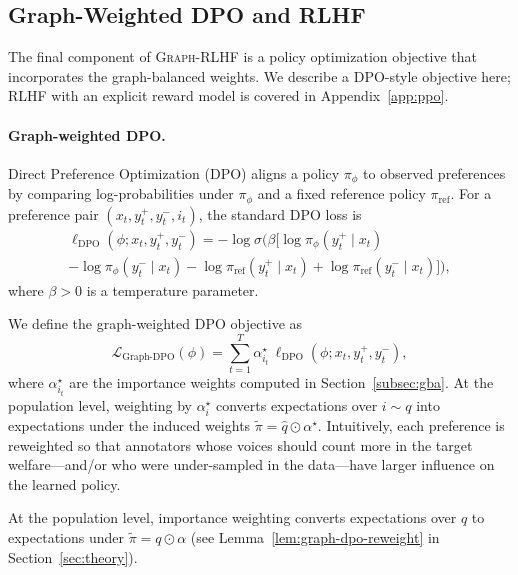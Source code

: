\documentclass{article}
\theoremstyle{plain}
\theoremstyle{definition}
\theoremstyle{remark}
\begin{document}
\subsection{Graph-Weighted DPO and RLHF}
\label{subsec:graph-dpo}

The final component of \textsc{Graph-RLHF} is a policy optimization objective
that incorporates the graph-balanced weights. We describe a DPO-style
objective here; RLHF with an explicit reward model is covered in
Appendix~\ref{app:ppo}.

\paragraph{Graph-weighted DPO.}

Direct Preference Optimization (DPO) aligns a policy $\pi_\phi$ to observed
preferences by comparing log-probabilities under $\pi_\phi$ and a fixed
reference policy $\pi_{\text{ref}}$. For a preference pair
$(x_t, y_t^+, y_t^-, i_t)$, the standard DPO loss is
\begin{equation}
\begin{aligned}
    \ell_{\text{DPO}}(\phi; x_t, y_t^+, y_t^-)
    =
    - \log \sigma\Big(
        \beta \big[
        \log \pi_\phi(y_t^+ \mid x_t) \qquad \\ - \log \pi_\phi(y_t^- \mid x_t)
        - \log \pi_{\text{ref}}(y_t^+ \mid x_t)
        + \log \pi_{\text{ref}}(y_t^- \mid x_t)
        \big]
    \Big),
    \label{eq:dpo}
\end{aligned}
\end{equation}
where $\beta > 0$ is a temperature parameter.

We define the graph-weighted DPO objective as
\begin{equation}
    \mathcal{L}_{\text{Graph-DPO}}(\phi)
    =
    \sum_{t=1}^T
    \alpha_{i_t}^\star \,
    \ell_{\text{DPO}}(\phi; x_t, y_t^+, y_t^-),
    \label{eq:graph-dpo}
\end{equation}
where $\alpha_{i_t}^\star$ are the importance weights computed in
Section~\ref{subsec:gba}. At the population level, weighting by
$\alpha_i^\star$ converts expectations over $i \sim q$ into expectations
under the induced weights $\tilde\pi = \hat q \odot \alpha^\star$.
Intuitively, each preference is reweighted so that annotators whose voices
should count more in the target welfare---and/or who were under-sampled in
the data---have larger influence on the learned policy.

At the population level, importance weighting converts expectations over $q$ to expectations under $\tilde\pi = q \odot \alpha$ (see Lemma~\ref{lem:graph-dpo-reweight} in Section~\ref{sec:theory}).
\end{document}
